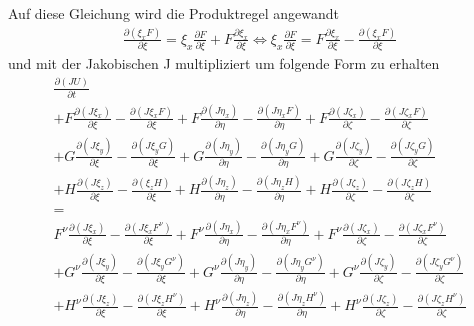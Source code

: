 Auf diese Gleichung wird die Produktregel angewandt
\begin{align*}
\frac{\partial \left(\xi_x F\right)}{\partial \xi}=\xi_x\frac{\partial F}{\partial \xi}+F\frac{\partial \xi_x}{\partial \xi}
\Leftrightarrow
\xi_x\frac{\partial F}{\partial \xi}=F\frac{\partial \xi_x}{\partial \xi}-\frac{\partial \left(\xi_x F\right)}{\partial \xi}
\end{align*}
und mit der Jakobischen J multipliziert um folgende Form zu erhalten
\begin{align*}
\frac{\partial \left( JU\right)}{\partial t}
\\
+F\frac{\partial \left(J\xi_x\right)}{\partial \xi}-\frac{\partial \left(J\xi_x F\right)}{\partial \xi}+F\frac{\partial \left(J\eta_x\right)}{\partial \eta}-\frac{\partial \left(J\eta_x F\right)}{\partial \eta}+F\frac{\partial \left(J\zeta_x\right)}{\partial \zeta}-\frac{\partial \left(J\zeta_x F\right)}{\partial \zeta}
\\
+G\frac{\partial \left(J\xi_y\right)}{\partial \xi}-\frac{\partial \left(J\xi_y G\right)}{\partial \xi}+G\frac{\partial \left(J\eta_y\right)}{\partial \eta}-\frac{\partial \left(J\eta_y G\right)}{\partial \eta}+G\frac{\partial \left(J\zeta_y\right)}{\partial \zeta}-\frac{\partial \left(J\zeta_y G\right)}{\partial \zeta}
\\
+H\frac{\partial \left(J\xi_z\right)}{\partial \xi}-\frac{\partial \left(\xi_z H\right)}{\partial \xi}+H\frac{\partial \left(J\eta_z\right)}{\partial \eta}-\frac{\partial \left(J\eta_z H\right)}{\partial \eta}+H\frac{\partial \left(J\zeta_z\right)}{\partial \zeta}-\frac{\partial \left(J\zeta_z H\right)}{\partial \zeta}
\\
=
\\
F^\nu\frac{\partial \left(J\xi_x\right)}{\partial \xi}-\frac{\partial \left(J\xi_x F^\nu\right)}{\partial \xi}+F^\nu\frac{\partial \left(J\eta_x\right)}{\partial \eta}-\frac{\partial \left(J\eta_x F^\nu\right)}{\partial \eta}+F^\nu\frac{\partial \left(J\zeta_x\right)}{\partial \zeta}-\frac{\partial \left(J\zeta_x F^\nu\right)}{\partial \zeta}
\\
+G^\nu\frac{\partial \left(J\xi_y\right)}{\partial \xi}-\frac{\partial \left(J\xi_y G^\nu\right)}{\partial \xi}+G^\nu\frac{\partial \left(J\eta_y\right)}{\partial \eta}-\frac{\partial \left(J\eta_y G^\nu\right)}{\partial \eta}+G^\nu\frac{\partial \left(J\zeta_y\right)}{\partial \zeta}-\frac{\partial \left(J\zeta_y G^\nu\right)}{\partial \zeta}
\\
+H^\nu\frac{\partial \left(J\xi_z\right)}{\partial \xi}-\frac{\partial \left(J\xi_z H^\nu\right)}{\partial \xi}+H^\nu\frac{\partial \left(J\eta_z\right)}{\partial \eta}-\frac{\partial \left(J\eta_z H^\nu\right)}{\partial \eta}+H^\nu\frac{\partial \left(J\zeta_z\right)}{\partial \zeta}-\frac{\partial \left(J\zeta_z H^\nu\right)}{\partial \zeta}
\end{align*}
